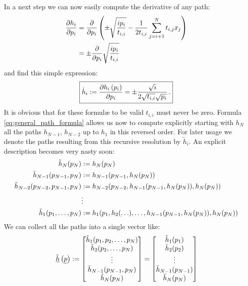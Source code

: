 \documentclass[a4paper,10pt]{article}
\begin{document}
In a next step we can now easily compute the derivative of any path:
\begin{equation}
\begin{split}
  \frac{\partial h_i}{\partial p_i}
  & = \frac{\partial }{\partial p_i}
      \left(\pm \sqrt{\frac{i p_i}{t_{i,i}}} -\frac{1}{2 t_{i,i}} \sum_{j=i+1}^{N} t_{i,j} x_j\right) \\
  & = \pm \frac{\partial }{\partial p_i} \sqrt{\frac{i p_i}{t_{i,i}}}
\end{split}
\end{equation}
and find this simple expression:
\begin{equation} \label{eq:general_path_derivative_formula}
\boxed{
  \dot{h}_i := \frac{\partial h_i\left(p_i\right)}{\partial p_i}
  = \pm \frac{\sqrt{\imath}}{2 \sqrt{t_{i,i}}\sqrt{p_i}} \,.
}
\end{equation}
It is obvious that for these formul\ae{} to be valid
$t_{i,i}$ must never be zero.
Formula \eqref{eq:general_path_formula} allows us now to compute explicitly
starting with $h_N$ all the paths $h_{N-1}$, $h_{N-2}$ up to $h_1$ in
this reversed order.
For later usage we denote the paths resulting from this
recursive resolution by $\tilde{h}_i$. An explicit description
becomes very nasty soon:
\begin{equation*}
\begin{split}
  \tilde{h}_N(p_N)
  & := h_N(p_N) \\
  \tilde{h}_{N-1}(p_{N-1}, p_N)
  & := h_{N-1}(p_{N-1},
                    h_N(p_N)
                   ) \\
  \tilde{h}_{N-2}(p_{N-2}, p_{N-1}, p_N)
  & := h_{N-2}(p_{N-2},
                    h_{N-1}(p_{N-1},
                      h_N(p_N)
                    ),
                    h_N(p_N)
                   ) \\
  & \vdots \\
  \tilde{h}_1(p_1, \ldots, p_N)
  & := h_1(p_1,
                h_2(\ldots),
                \ldots,
                h_{N-1}(p_{N-1}, h_N(p_N)),
                h_N(p_N)
               )
\end{split}
\end{equation*}
We can collect all the paths into a single vector like:
\begin{equation}
 \underline{\tilde{h}}\left(\underline{p}\right) :=
 \begin{bmatrix}
  \tilde{h}_1(p_1, p_2, \ldots, p_N) \\
  \tilde{h}_2(p_2, \ldots, p_N) \\
  \vdots \\
  \tilde{h}_{N-1}(p_{N-1}, p_N) \\
  \tilde{h}_{N}(p_N) \\
 \end{bmatrix}
 =
 \begin{bmatrix}
  \tilde{h}_1(p_1) \\
  \tilde{h}_2(p_2) \\
  \vdots \\
  \tilde{h}_{N-1}(p_{N-1}) \\
  \tilde{h}_{N}(p_N) \\
 \end{bmatrix}
\end{equation}
\end{document}
